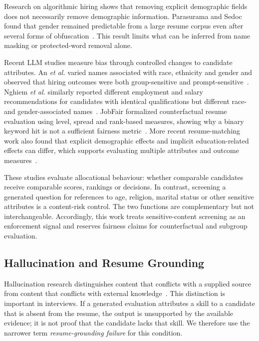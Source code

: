 \documentclass[conference]{IEEEtran}
\begin{document}
Research on algorithmic hiring shows that removing explicit demographic fields does not necessarily remove demographic information. Parasurama and Sedoc found that gender remained predictable from a large resume corpus even after several forms of obfuscation~\cite{parasurama2022gendered}. This result limits what can be inferred from name masking or protected-word removal alone.

Recent LLM studies measure bias through controlled changes to candidate attributes. An \emph{et al.} varied names associated with race, ethnicity and gender and observed that hiring outcomes were both group-sensitive and prompt-sensitive~\cite{an2024discriminate}. Nghiem \emph{et al.} similarly reported different employment and salary recommendations for candidates with identical qualifications but different race- and gender-associated names~\cite{nghiem2024name}. JobFair formalized counterfactual resume evaluation using level, spread and rank-based measures, showing why a binary keyword hit is not a sufficient fairness metric~\cite{wang2024jobfair}. More recent resume-matching work also found that explicit demographic effects and implicit education-related effects can differ, which supports evaluating multiple attributes and outcome measures~\cite{iso2025bias}.

These studies evaluate allocational behaviour: whether comparable candidates receive comparable scores, rankings or decisions. In contrast, screening a generated question for references to age, religion, marital status or other sensitive attributes is a content-risk control. The two functions are complementary but not interchangeable. Accordingly, this work treats sensitive-content screening as an enforcement signal and reserves fairness claims for counterfactual and subgroup evaluation.

\subsection{Hallucination and Resume Grounding}

Hallucination research distinguishes content that conflicts with a supplied source from content that conflicts with external knowledge~\cite{zhang2025sirens}. This distinction is important in interviews. If a generated evaluation attributes a skill to a candidate that is absent from the resume, the output is unsupported by the available evidence; it is not proof that the candidate lacks that skill. We therefore use the narrower term \emph{resume-grounding failure} for this condition.
\end{document}
